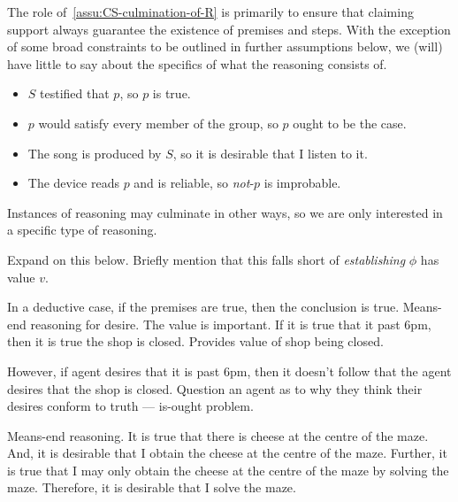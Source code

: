 \begin{note}
  The role of~\autoref{assu:CS-culmination-of-R} is primarily to ensure that claiming support always guarantee the existence of premises and steps.
  With the exception of some broad constraints to be outlined in further assumptions below, we (will) have little to say about the specifics of what the reasoning consists of.
\end{note}

\begin{note}
  \begin{itemize}
  \item \(S\) testified that \(p\), so \(p\) is true.
  \item \(p\) would satisfy every member of the group, so \(p\) ought to be the case.
  \item The song is produced by \(S\), so it is desirable that I listen to it.
  \item The device reads \(p\) and is reliable, so \emph{not}-\(p\) is improbable.
  \end{itemize}
\end{note}

\begin{note}
  Instances of reasoning may culminate in other ways, so we are only interested in a specific type of reasoning.
\end{note}

\begin{note}
  Expand on this below.
  Briefly mention that this falls short of \emph{establishing} \(\phi\) has value \(v\).
\end{note}

\begin{note}
  In a deductive case, if the premises are true, then the conclusion is true.
  Means-end reasoning for desire.
  The value is important.
  If it is true that it past 6pm, then it is true the shop is closed.
  Provides value of shop being closed.

  However, if agent desires that it is past 6pm, then it doesn't follow that the agent desires that the shop is closed.
  Question an agent as to why they think their desires conform to truth --- is-ought problem.

  Means-end reasoning.
  It is true that there is cheese at the centre of the maze.
  And, it is desirable that I obtain the cheese at the centre of the maze.
  Further, it is true that I may only obtain the cheese at the centre of the maze by solving the maze.
  Therefore, it is desirable that I solve the maze.
\end{note}

